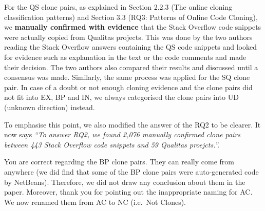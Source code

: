 \documentclass[a4paper,twoside,10pt]{reviewresponse}
\begin{document}
For the QS clone pairs, as explained in Section 2.2.3 (The online cloning classification patterns) and Section 3.3 (RQ3: Patterns of Online Code Cloning), we \textbf{manually confirmed with evidence} that the Stack Overflow code snippets were actually copied from Qualitas projects. This was done by the two authors reading the Stack Overflow answers containing the QS code snippets and looked for evidence such as explanation in the text or the code comments and made their decision. The two authors also compared their results and discussed until a consensus was made. Similarly, the same process was applied for the SQ clone pair. 
In case of a doubt or not enough cloning evidence and the clone pairs did not fit into EX, BP and IN, we always categorised the clone pairs into UD (unknown direction) instead. 

To emphasise this point, we also modified the answer of the RQ2 to be clearer. It now says \textit{``To answer RQ2, we found 2,076 manually confirmed clone pairs between 443 Stack Overflow code snippets
and 59 Qualitas proejcts.''.}


You are correct regarding the BP clone pairs. They can really come from anywhere (we did find that some of the BP clone pairs were auto-generated code by NetBeans). Therefore, we did not draw any conclusion about them in the paper. 
Moreover, thank you for pointing out the inappropriate naming for AC. We now renamed them from AC to NC (i.e.~Not Clones).
\end{document}
